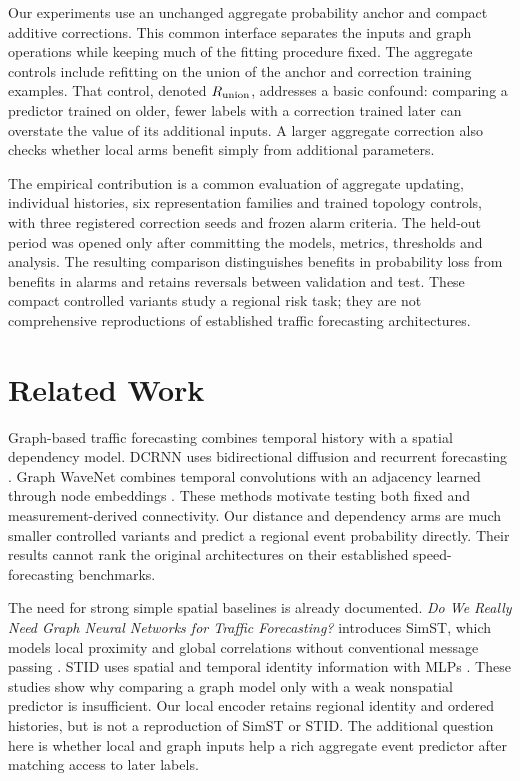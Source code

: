 \documentclass{llncs}
\begin{document}
Our experiments use an unchanged aggregate probability anchor and compact additive corrections. This common interface separates the inputs and graph operations while keeping much of the fitting procedure fixed. The aggregate controls include refitting on the union of the anchor and correction training examples. That control, denoted $R_{\rm union}$, addresses a basic confound: comparing a predictor trained on older, fewer labels with a correction trained later can overstate the value of its additional inputs. A larger aggregate correction also checks whether local arms benefit simply from additional parameters.

The empirical contribution is a common evaluation of aggregate updating, individual histories, six representation families and trained topology controls, with three registered correction seeds and frozen alarm criteria. The held-out period was opened only after committing the models, metrics, thresholds and analysis. The resulting comparison distinguishes benefits in probability loss from benefits in alarms and retains reversals between validation and test. These compact controlled variants study a regional risk task; they are not comprehensive reproductions of established traffic forecasting architectures.

\section{Related Work}
Graph-based traffic forecasting combines temporal history with a spatial dependency model. DCRNN uses bidirectional diffusion and recurrent forecasting \cite{dcrnn}. Graph WaveNet combines temporal convolutions with an adjacency learned through node embeddings \cite{gwnet}. These methods motivate testing both fixed and measurement-derived connectivity. Our distance and dependency arms are much smaller controlled variants and predict a regional event probability directly. Their results cannot rank the original architectures on their established speed-forecasting benchmarks.

The need for strong simple spatial baselines is already documented. \emph{Do We Really Need Graph Neural Networks for Traffic Forecasting?} introduces SimST, which models local proximity and global correlations without conventional message passing \cite{simst}. STID uses spatial and temporal identity information with MLPs \cite{stid}. These studies show why comparing a graph model only with a weak nonspatial predictor is insufficient. Our local encoder retains regional identity and ordered histories, but is not a reproduction of SimST or STID. The additional question here is whether local and graph inputs help a rich aggregate event predictor after matching access to later labels.
\end{document}
